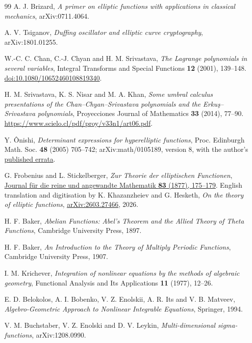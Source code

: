 \documentclass[11pt]{article}
\begin{document}
\begin{thebibliography}{99}
A. J. Brizard, \emph{A primer on elliptic functions with applications in classical mechanics}, arXiv:0711.4064.

A. V. Tsiganov, \emph{Duffing oscillator and elliptic curve cryptography}, arXiv:1801.01255.

W.-C. C. Chan, C.-J. Chyan and H. M. Srivastava,
\emph{The Lagrange polynomials in several variables},
Integral Transforms and Special Functions \textbf{12} (2001), 139--148.
\href{https://doi.org/10.1080/10652460108819340}{doi:10.1080/10652460108819340}.

H. M. Srivastava, K. S. Nisar and M. A. Khan,
\emph{Some umbral calculus presentations of the Chan--Chyan--Srivastava
polynomials and the Erku\c{s}--Srivastava polynomials},
Proyecciones Journal of Mathematics \textbf{33} (2014), 77--90.
\url{https://www.scielo.cl/pdf/proy/v33n1/art06.pdf}.

Y. \^Onishi, \emph{Determinant expressions for hyperelliptic functions}, Proc. Edinburgh Math. Soc. \textbf{48} (2005) 705--742; arXiv:math/0105189, version 8, with the author's \href{https://math-meijo-u.heteml.net/research/pub/correct_pem.pdf}{published errata}.

G. Frobenius and L. Stickelberger, \emph{Zur Theorie der elliptischen Functionen}, \href{https://doi.org/10.1515/crll.1877.83.175}{Journal f\"ur die reine und angewandte Mathematik \textbf{83} (1877), 175--179}. English translation and digitisation by K. Khazanzheiev and G. Hesketh, \emph{On the theory of elliptic functions}, \href{https://arxiv.org/abs/2603.27466}{arXiv:2603.27466}, 2026.

H. F. Baker, \emph{Abelian Functions: Abel's Theorem and the Allied Theory of Theta Functions}, Cambridge University Press, 1897.

H. F. Baker, \emph{An Introduction to the Theory of Multiply Periodic Functions}, Cambridge University Press, 1907.

I. M. Krichever, \emph{Integration of nonlinear equations by the methods of algebraic geometry}, Functional Analysis and Its Applications \textbf{11} (1977), 12--26.

E. D. Belokolos, A. I. Bobenko, V. Z. Enolskii, A. R. Its and V. B. Matveev, \emph{Algebro-Geometric Approach to Nonlinear Integrable Equations}, Springer, 1994.

V. M. Buchstaber, V. Z. Enolski and D. V. Leykin, \emph{Multi-dimensional sigma-functions}, arXiv:1208.0990.


\end{thebibliography}
\end{document}
